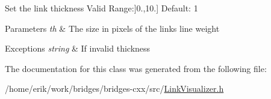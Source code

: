 Set the link thickness Valid Range\+:\mbox{]}0.,10.\mbox{]} Default\+: 1


\begin{DoxyParams}{Parameters}
{\em th} & The size in pixels of the link\textquotesingle{}s line weight \\
\hline
\end{DoxyParams}

\begin{DoxyExceptions}{Exceptions}
{\em string} & If invalid thickness \\
\hline
\end{DoxyExceptions}


The documentation for this class was generated from the following file\+:\begin{DoxyCompactItemize}
\item 
/home/erik/work/bridges/bridges-\/cxx/src/\hyperlink{_link_visualizer_8h}{Link\+Visualizer.\+h}\end{DoxyCompactItemize}
